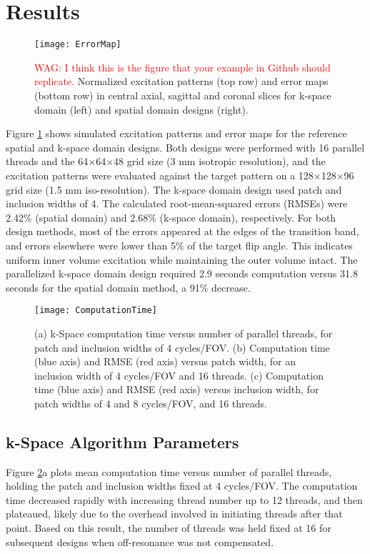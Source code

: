 \section*{Results}

\begin{figure}
	\centering
	\texttt{[image: ErrorMap]}
	\caption{\textcolor{red}{WAG: I think this is the figure that your example in Github should replicate.}
	Normalized excitation patterns (top row) and error maps (bottom row) in central axial, sagittal and coronal slices 
	for k-space domain (left) and spatial domain designs (right).}
	\label{fig:ErrorMap}
\end{figure}
Figure \ref{fig:ErrorMap} shows simulated excitation patterns and error maps for the reference spatial and k-space domain designs. 
Both designs were performed with 16 parallel threads and the 64$\times$64$\times$48 grid size (3 mm isotropic resolution), 
and the excitation patterns were evaluated against the target pattern on a 128$\times$128$\times$96 grid size (1.5 mm iso-resolution). 
The k-space domain design used patch and inclusion widths of 4.
The calculated root-mean-squared errors (RMSEs) were 2.42\% (spatial domain) and 2.68\% (k-space domain), 
respectively. 
For both design methods, most of the errors appeared at the edges of the transition band, 
and errors elsewhere were lower than 5\% of the target flip angle. 
This indicates uniform inner volume excitation while maintaining the outer volume intact. 
The parallelized k-space domain design required 2.9 seconds computation versus 31.8 seconds for the spatial domain method, a 91\% decrease.

\begin{figure}
	\centering
	\texttt{[image: ComputationTime]}
	\caption{(a) k-Space computation time versus number of parallel threads, for patch and inclusion widths of 4 cycles/FOV. 
	(b) Computation time (blue axis) and RMSE (red axis) versus patch width, for an inclusion width of 4 cycles/FOV and 16 threads. 
	(c) Computation time (blue axis) and RMSE (red axis) versus inclusion width, for patch widths of 4 and 8 cycles/FOV, and 16 threads.}
	\label{fig:ComputationTime}
\end{figure}
\subsection*{k-Space Algorithm Parameters}
Figure \ref{fig:ComputationTime}a plots mean computation time versus number of parallel threads,
holding the patch and inclusion widths fixed at 4 cycles/FOV. 
The computation time decreased rapidly with increasing thread number up to 12 threads, 
and then plateaued, likely due to the overhead involved in initiating threads after that point.
Based on this result, the number of threads was held fixed at 16 for subsequent designs when off-resonance was not compensated.

